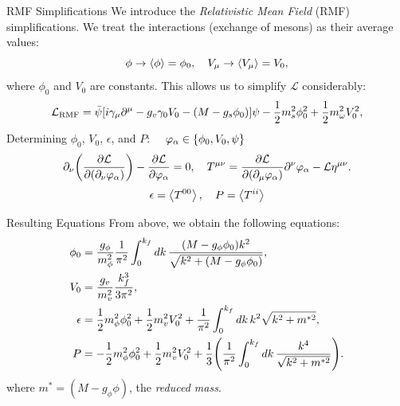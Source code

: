 \documentclass[]{beamer}
\newcommand{\Letter}[1]{\mathcal{#1}}
\newcommand{\Lag}{\Letter{L}}
\newcommand{\p}{\partial}
\begin{document}
    \begin{frame}{RMF Simplifications}
        We introduce the \textit{Relativistic Mean Field} (RMF) simplifications. \pause We treat the interactions (exchange of mesons) as their average values: \pause
        \[\phi \to \expval{\phi} = \phi_0, \quad V_\mu \to \expval{V_\mu} = V_0,\]
        where $\phi_0$ and $V_0$ are constants. \pause This allows us to simplify $\Lag$ considerably: \pause
        \begin{align*}
            \Lag_\text{RMF} = \bar\psi \bqty{i\gamma_\mu\p^\mu - g_v \gamma_0 V_0 - (M-g_s\phi_0)} \psi - \frac{1}{2} m_s^2 \phi_0^2 + \frac{1}{2} m_\omega^2 V_0^2,
        \end{align*} \pause
        Determining $\phi_0$, $V_0$, $\epsilon$, and $P$: \pause $\quad\varphi_\alpha \in \Bqty{\phi_0, V_0, \psi}$
        \[\p_\nu\qty(\pdv{\Lag}{(\p_\nu \varphi_\alpha)}) - \pdv{\Lag}{\varphi_\alpha} = 0, \quad
        T^{\mu\nu} = \pdv{\Lag}{(\p_\mu \varphi_\alpha)}\p^\nu \varphi_\alpha - \Lag \eta^{\mu\nu}.\] \pause
        $$\epsilon = \expval{T^{00}}, \quad P = \expval{T^{ii}}$$
    \end{frame}

    \begin{frame}{Resulting Equations}
        From above, we obtain the following equations: \pause
        \begin{align*}
            \phi_0 &= \frac{g_\phi}{m_\phi^2} \frac{1}{\pi^2} \int_0^{k_f} \dd{k} \frac{(M-g_\phi \phi_0) k^2 }{\sqrt{k^2 + (M-g_\phi \phi_0)}},  \\
            V_0 &= \frac{g_v}{m_v^2} \frac{k_f^3}{3\pi^2}, \\
            \epsilon & = \frac{1}{2} m_\phi^2 \phi_0^2 + \frac{1}{2} m_v^2 V_0^2 + \frac{1}{\pi^2} \int_0^{k_f} \dd{k} k^2 \sqrt{k^2 + m^{*2}},\\
            P & = -\frac{1}{2} m_\phi^2 \phi_0^2 + \frac{1}{2} m_v^2 V_0^2 + \frac{1}{3} \pqty{\frac{1}{\pi^2} \int_0^{k_f} \dd{k}\frac{k^4}{\sqrt{k^2 + m^{*2}}}}.
        \end{align*}
        where $m^* = (M-g_\phi \phi)$, the \textit{reduced mass}. 
    \end{frame}
\end{document}
